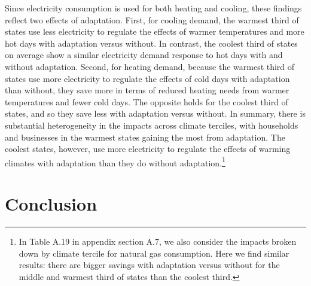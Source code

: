 \documentclass[11pt]{article}
\begin{document}
Since electricity consumption is used for both heating and cooling, these findings reflect two effects of adaptation. First, for cooling demand, the warmest third of states use less electricity to regulate the effects of warmer temperatures and more hot days with adaptation versus without. In contrast, the coolest third of states on average show a similar electricity demand response to hot days with and without adaptation. Second, for heating demand, because the warmest third of states use more electricity to regulate the effects of cold days with adaptation than without, they save more in terms of reduced heating needs from warmer temperatures and fewer cold days. The opposite holds for the coolest third of states, and so they save less with adaptation versus without. %
In summary, there is substantial heterogeneity in the impacts across climate terciles, with households and businesses in the warmest states gaining the most from adaptation. The coolest states, however, use more electricity to regulate the effects of warming climates with adaptation than they do without adaptation.\footnote{ In Table A.19 in appendix section A.7, we also consider the impacts broken down by climate tercile for natural gas consumption. Here we find similar results: there are bigger savings with adaptation versus without for the middle and warmest third of states than the coolest third.}

\section{Conclusion \label{conclusion}}
\end{document}
